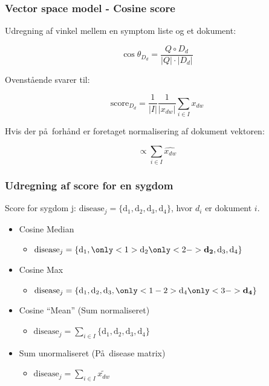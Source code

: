 \documentclass[xcolor=table]{beamer}
\begin{document}
\begin{frame}

  \frametitle{Vector space model - Cosine score}

  Udregning af vinkel mellem en symptom liste og et dokument:
  
  \[
  \cos \theta_{D_d} = \frac{Q \circ D_d}{|Q| \cdot |D_d|}
  \]
  
  Ovenst\aa ende svarer til:
  
  \[
  \textrm{score}_{D_d} = \frac{1}{|I|}\frac{1}{|x_{dw}|} \sum_{i \in I} x_{dw}
  \]
  
  Hvis der p\aa\ forh\aa nd er foretaget normalisering af dokument vektoren:
  
  \[
  \propto  \sum_{i \in I} \widehat{x_{dw}}
  \]
  
\end{frame}

\begin{frame}

  \frametitle{Udregning af score for en sygdom}
  Score for sygdom j:
  $\textrm{disease}_j = \{\textrm{d}_1, \textrm{d}_2,
  \textrm{d}_3, \textrm{d}_4 \}$, hvor $d_i$ er dokument $i$.

  \begin{itemize}
    \item Cosine Median
      \begin{itemize}
        \item $ \textrm{disease}_j =
        \{\textrm{d}_1, \only<1>{\textrm{d}_2}
        \only<2->{\textbf{d}_{\mathbf{2}}}, \textrm{d}_3,
        \textrm{d}_{4} \}$
      \end{itemize}
    \item Cosine Max
      \begin{itemize}
        \item $ \textrm{disease}_j =
        \{\textrm{d}_{1}, \textrm{d}_{2},
        \textrm{d}_{3}, \only<1-2>{\textrm{d}_{4}}
        \only<3->{\textbf{d}_{\mathbf{4}}} \}$
      \end{itemize}
    \item Cosine ``Mean'' (Sum normaliseret)
      \begin{itemize}
        \item $\textrm{disease}_j = \sum_{i \in I} \{\textrm{d}_1,
          \textrm{d}_2, \textrm{d}_3, \textrm{d}_4 \}$
      \end{itemize}
    \item Sum unormaliseret (P\aa\ disease matrix)
      \begin{itemize}
        \item $\textrm{disease}_j = \sum_{i \in I} \widetilde{x_{dw}}$
      \end{itemize}
  \end{itemize}

\end{frame}
\end{document}
